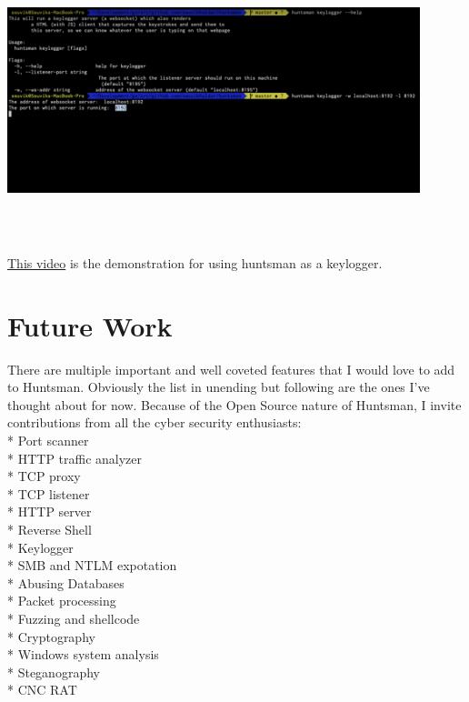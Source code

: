 \documentclass[12pt]{article}
\begin{document}
\includegraphics[width=12cm, height=8cm]{keylogger}

\href{https://youtu.be/BoPICq1MVhA}{This video} is the demonstration for using huntsman as a keylogger. 

\section{Future Work}
There are multiple important and well coveted features that I would love to add to Huntsman. Obviously the list in unending but following are the ones I've thought about for now. Because of the Open Source nature of Huntsman, I invite contributions from all the cyber security enthusiasts:\\
*  Port scanner\\
*  HTTP traffic analyzer\\
*  TCP proxy\\
*  TCP listener\\
*  HTTP server\\
*  Reverse Shell\\
*  Keylogger\\
*  SMB and NTLM expotation\\
*  Abusing Databases\\
*  Packet processing\\
*  Fuzzing and shellcode\\
*  Cryptography\\
*  Windows system analysis\\
*  Steganography\\
*  CNC RAT\\
\end{document}
